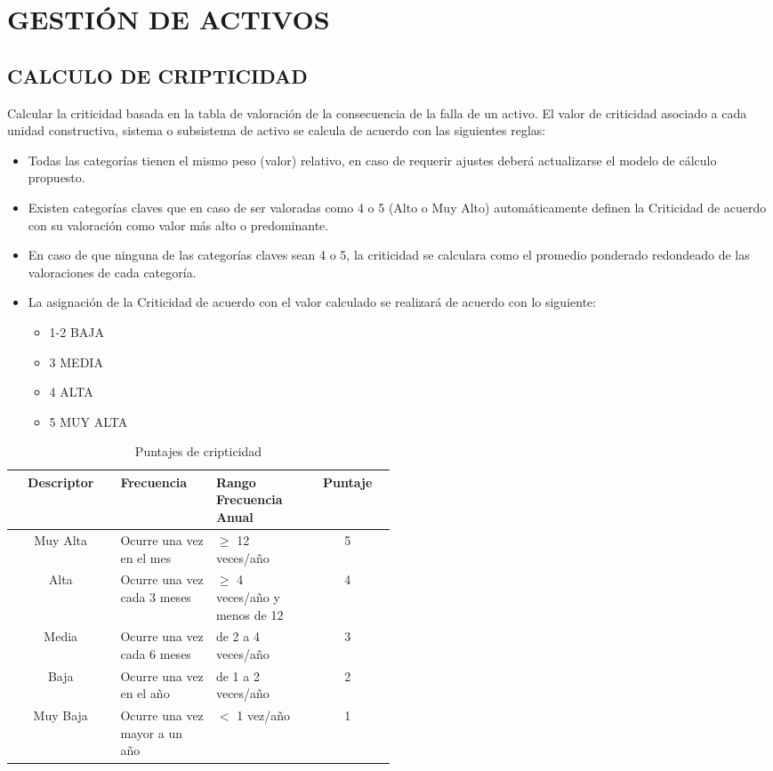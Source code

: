 \documentclass[a5paper]{book}%
\begin{document}
\chapter{GESTIÓN DE ACTIVOS}

\section{CALCULO DE CRIPTICIDAD}
Calcular la criticidad basada en la tabla de valoración de la consecuencia de la falla de un activo. El valor de criticidad asociado a cada unidad constructiva, sistema o subsistema de activo se calcula de acuerdo con las siguientes reglas:

\begin{itemize}
\item Todas las categorías tienen el mismo peso (valor) relativo, en caso de requerir ajustes deberá actualizarse el modelo de cálculo propuesto. 
\item Existen categorías claves que en caso de ser valoradas como 4 o 5 (Alto o Muy Alto) automáticamente definen la Criticidad de acuerdo con su valoración como valor más alto o predominante.
\item En caso de que ninguna de las categorías claves sean 4 o 5, la criticidad se calculara como el promedio ponderado redondeado de las valoraciones de cada categoría.
\item La asignación de la Criticidad de acuerdo con el valor calculado se realizará de acuerdo con lo siguiente:

    \begin{itemize}
    \item 1-2 BAJA
    \item 3 MEDIA
    \item 4 ALTA
    \item 5 MUY ALTA
    \end{itemize}
  \end{itemize}

  \begin{table}[H]
    \caption{Puntajes de cripticidad}
   
    \begin{tabular}{|c|p{0.25\linewidth}|p{0.25\linewidth}|c|}
      \hline
      Descriptor &Frecuencia &Rango Frecuencia Anual & Puntaje \\\hline
      Muy Alta&Ocurre una vez en el mes&$\geq$ 12 veces/año&5 \\\hline
      Alta&Ocurre una vez cada 3 meses&$\geq$ 4 veces/año y menos de 12 &4 \\\hline
      Media&Ocurre una vez cada 6 meses& de 2 a 4 veces/año  & 3 \\\hline
      Baja&Ocurre una vez en el año& de 1 a 2 veces/año & 2\\\hline
      Muy Baja&Ocurre una vez mayor a un año& $<$ 1 vez/año&1\\\hline
  \end{tabular}
  \end{table}
\end{document}
